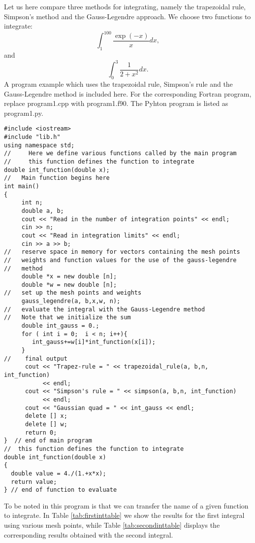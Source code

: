 Let us here compare three methods for integrating, namely the trapezoidal rule,
Simpson's method and the Gauss-Legendre approach. 
We choose two functions to integrate:
\[
  \int_1^{100}\frac{\exp{(-x)}}{x}dx,
\]
and 
\[
  \int_{0}^{3}\frac{1}{2+x^2}dx.
\] 
A program example which uses the trapezoidal rule, Simpson's rule
and the Gauss-Legendre method is included here. For the corresponding Fortran program, replace program1.cpp
with program1.f90. The Pyhton program is listed as program1.py.
\lstset{language=c++}
\begin{lstlisting}[title={\url{http://folk.uio.no/mhjensen/compphys/programs/chapter04/cpp/program1.cpp}}]
#include <iostream>
#include "lib.h"
using namespace std;
//     Here we define various functions called by the main program
//     this function defines the function to integrate
double int_function(double x);
//   Main function begins here
int main()
{
     int n;
     double a, b;
     cout << "Read in the number of integration points" << endl;
     cin >> n;
     cout << "Read in integration limits" << endl;
     cin >> a >> b;
//   reserve space in memory for vectors containing the mesh points
//   weights and function values for the use of the gauss-legendre
//   method
     double *x = new double [n];
     double *w = new double [n];
//   set up the mesh points and weights
     gauss_legendre(a, b,x,w, n);
//   evaluate the integral with the Gauss-Legendre method
//   Note that we initialize the sum
     double int_gauss = 0.;
     for ( int i = 0;  i < n; i++){
        int_gauss+=w[i]*int_function(x[i]);
     }
//    final output
      cout << "Trapez-rule = " << trapezoidal_rule(a, b,n, int_function)
           << endl;
      cout << "Simpson's rule = " << simpson(a, b,n, int_function) 
           << endl;
      cout << "Gaussian quad = " << int_gauss << endl;
      delete [] x;
      delete [] w;
      return 0;
}  // end of main program
//  this function defines the function to integrate
double int_function(double x)
{
  double value = 4./(1.+x*x);
  return value;
} // end of function to evaluate
\end{lstlisting}
To be noted in this program is that we can transfer the name of a given function to integrate.
In Table \ref{tab:firstinttable} we show the results for the first integral using various 
mesh points, while Table \ref{tab:secondinttable} displays the corresponding results obtained
with the second integral.
